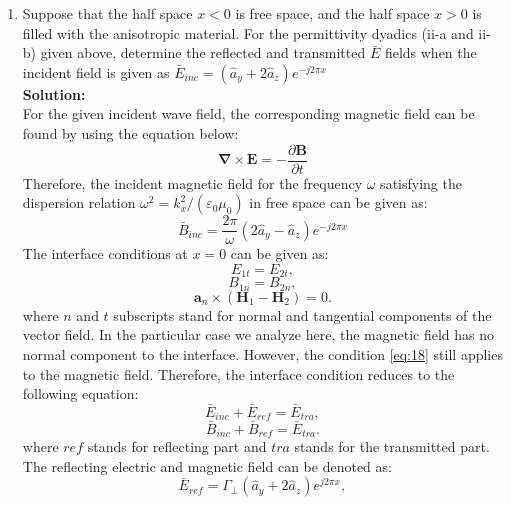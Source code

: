\documentclass[11pt]{amsart}
\begin{document}
\begin{enumerate}
\item  Suppose that the half space $x<0$ is free space, and the half space $x>0$ is filled with the
anisotropic material. For the permittivity dyadics (ii-a and ii-b) given above, determine the
reflected and transmitted $\bar{E}$ fields when the incident field is given as $\bar{E}_{inc}=(\hat{a}_y +2 \hat{a}_z)e^{-j 2 \pi x}$
\\
\textbf{Solution:}\\
For the given incident wave field, the corresponding magnetic field can be found by using the equation below:
\begin{equation}
\mathbf{\nabla}\times \mathbf{E}=-\frac{\partial \mathbf{B}}{\partial t}
\end{equation}
Therefore, the incident magnetic field for the frequency $\omega$ satisfying the dispersion relation $\omega^2=k_{x}^2/(\varepsilon_0 \mu_0)$ in free space can be given as:
\begin{equation}
\bar{B}_{inc}=\frac{2 \pi}{\omega}(2\hat{a}_y - \hat{a}_z)e^{-j 2 \pi x}
\end{equation}
The interface conditions at $x=0$ can be given as:
\begin{equation}
E_{1t}=E_{2t},
\end{equation}
\begin{equation}
B_{1n}=B_{2n},
\end{equation}
\begin{equation}
\label{eq:18}
\mathbf{a}_{n}\times(\mathbf{H}_{1}-\mathbf{H}_{2})=0.
\end{equation}
where $n$ and $t$ subscripts stand for normal and tangential components of the vector field. In the particular case we analyze here, the magnetic field has no normal component to the interface. However, the condition \ref{eq:18} still applies to the magnetic field. Therefore, the interface condition reduces to the following equation:
\begin{equation}
\label{eq:19}
\bar{E}_{inc}+\bar{E}_{ref}=\bar{E}_{tra},
\end{equation}
\begin{equation}
\label{eq:20}
\bar{B}_{inc}+\bar{B}_{ref}=\bar{E}_{tra}.
\end{equation}
where $ref$ stands for reflecting part and $tra$ stands for the transmitted part. The reflecting electric and magnetic field can be denoted as: 
\begin{equation}
\bar{E}_{ref}=\Gamma_{\bot}(\hat{a}_y +2 \hat{a}_z)e^{j 2 \pi x},
\end{equation}

\end{enumerate}
\end{document}
